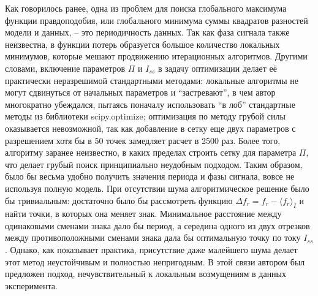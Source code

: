 \documentclass[14pt, a4paper]{extreport}
\numberwithin{equation}{section}
\begin{document}
Как говорилось ранее, одна из проблем для поиска глобального максимума функции правдоподобия, или глобального минимума суммы квадратов разностей модели и данных, -- это периодичность данных. Так как фаза сигнала также неизвестна, в функции потерь образуется большое количество локальных минимумов, которые мешают продвижению итерационных алгоритмов. Другими словами, включение параметров $\Pi$ и $I_{ss}$ в задачу оптимизации делает её практически неразрешимой стандартными методами: локальные алгоритмы не могут сдвинуться от начальных параметров и ``застревают'', в чем автор многократно убеждался, пытаясь поначалу использовать ``в лоб'' стандартные методы из библиотеки \foreignlanguage{english}{scipy.optimize}; оптимизация по методу грубой силы оказывается невозможной, так как добавление в сетку еще двух параметров с разрешением хотя бы в 50 точек замедляет расчет в 2500 раз. Более того, алгоритму заранее неизвестно, в каких пределах строить сетку для параметра $\Pi$, что делает грубый поиск принципиально неудобным подходом. Таким образом, было бы весьма удобно получить значения периода и фазы сигнала, вовсе не используя полную модель. При отсутствии шума алгоритмическое решение было бы тривиальным: достаточно было бы рассмотреть функцию $\Delta f_r = f_r-\langle f_r \rangle_{I}$ и найти точки, в которых она меняет знак. Минимальное расстояние между одинаковыми сменами знака дало бы период, а середина одного из двух отрезков между противоположными сменами знака дала бы оптимальную точку по току $I_{ss}$. Однако, как показывает практика, присутствие даже малейшего шума делает этот метод неустойчивым и полностью непригодным. В этой связи автором был предложен подход, нечувствительный к локальным возмущениям в данных эксперимента.
\end{document}

